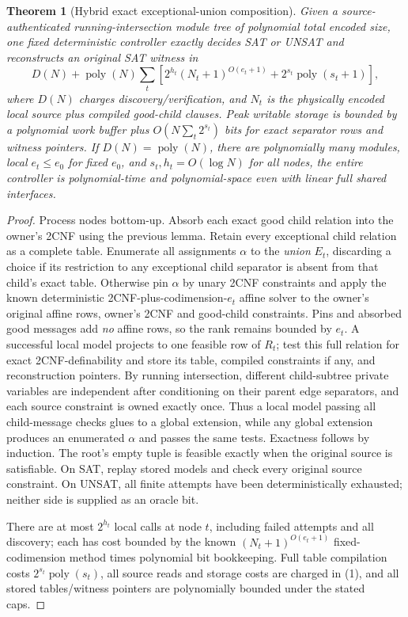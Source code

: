 \documentclass[11pt]{article}
\newtheorem{theorem}{Theorem}
\begin{document}
\begin{theorem}[Hybrid exact exceptional-union composition]
Given a source-authenticated running-intersection module tree of polynomial total encoded size, one fixed deterministic controller exactly decides SAT or UNSAT and reconstructs an original SAT witness in
\[
 \boxed{D(N)+\operatorname{poly}(N)
 \sum_t \left[2^{h_t}(N_t+1)^{O(e_t+1)}
 +2^{s_t}\operatorname{poly}(s_t+1)\right],}
 \tag{1}
\]
where $D(N)$ charges discovery/verification, and $N_t$ is the physically encoded local source plus compiled good-child clauses. Peak writable storage is bounded by a polynomial work buffer plus $O(N\sum_t2^{s_t})$ bits for exact separator rows and witness pointers. If $D(N)=\operatorname{poly}(N)$, there are polynomially many modules, local $e_t\le e_0$ for fixed $e_0$, and $s_t,h_t=O(\log N)$ for all nodes, the entire controller is polynomial-time and polynomial-space even with linear full shared interfaces.
\end{theorem}
\begin{proof}
Process nodes bottom-up. Absorb each exact good child relation into the owner's 2CNF using the previous lemma. Retain every exceptional child relation as a complete table. Enumerate all assignments $\alpha$ to the \emph{union} $E_t$, discarding a choice if its restriction to any exceptional child separator is absent from that child's exact table. Otherwise pin $\alpha$ by unary 2CNF constraints and apply the known deterministic 2CNF-plus-codimension-$e_t$ affine solver to the owner's original affine rows, owner's 2CNF and good-child constraints. Pins and absorbed good messages add \emph{no} affine rows, so the rank remains bounded by $e_t$. A successful local model projects to one feasible row of $R_t$; test this full relation for exact 2CNF-definability and store its table, compiled constraints if any, and reconstruction pointers. By running intersection, different child-subtree private variables are independent after conditioning on their parent edge separators, and each source constraint is owned exactly once. Thus a local model passing all child-message checks glues to a global extension, while any global extension produces an enumerated $\alpha$ and passes the same tests. Exactness follows by induction. The root's empty tuple is feasible exactly when the original source is satisfiable. On SAT, replay stored models and check every original source constraint. On UNSAT, all finite attempts have been deterministically exhausted; neither side is supplied as an oracle bit.

There are at most $2^{h_t}$ local calls at node $t$, including failed attempts and all discovery; each has cost bounded by the known $(N_t+1)^{O(e_t+1)}$ fixed-codimension method times polynomial bit bookkeeping. Full table compilation costs $2^{s_t}\operatorname{poly}(s_t)$, all source reads and storage costs are charged in (1), and all stored tables/witness pointers are polynomially bounded under the stated caps.
\end{proof}
\end{document}
